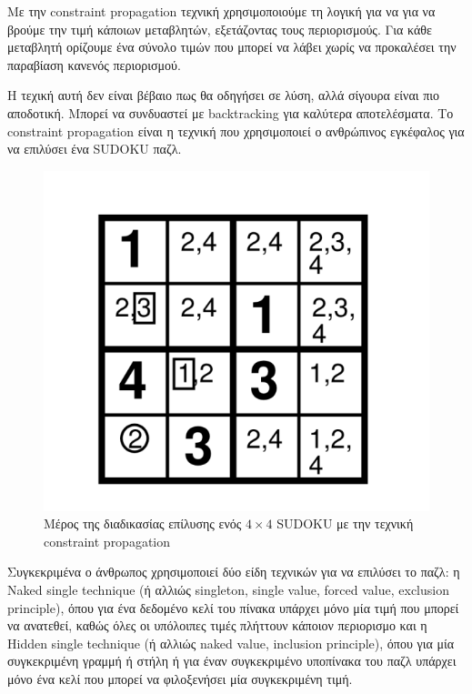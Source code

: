 \documentclass[12pt]{book}
\theoremstyle{definition}
\begin{document}
Με την constraint propagation τεχνική χρησιμοποιούμε τη λογική για να για να βρούμε την τιμή κάποιων μεταβλητών, εξετάζοντας τους περιορισμούς. Για κάθε μεταβλητή ορίζουμε ένα σύνολο τιμών που μπορεί να λάβει χωρίς να προκαλέσει την παραβίαση κανενός περιορισμού. \par

Η τεχική αυτή δεν είναι βέβαιο πως θα οδηγήσει σε λύση, αλλά σίγουρα είναι πιο αποδοτική. Μπορεί να συνδυαστεί με backtracking για καλύτερα αποτελέσματα. Το constraint propagation είναι η τεχνική που χρησιμοποιεί ο ανθρώπινος εγκέφαλος για να επιλύσει ένα SUDOKU παζλ. \par

\begin{figure}[h]
	\centering	
	\includegraphics[scale=0.45]{Figures/propagation.png}
	\caption{Μέρος της διαδικασίας επίλυσης ενός \(4 \times 4\) SUDOKU με την τεχνική constraint propagation}
\end{figure}

Συγκεκριμένα ο άνθρωπος χρησιμοποιεί δύο είδη τεχνικών για να επιλύσει το παζλ: η Naked single technique (ή αλλιώς singleton, single value, forced value, exclusion
principle), όπου για ένα δεδομένο κελί του πίνακα υπάρχει μόνο μία τιμή που μπορεί να ανατεθεί, καθώς όλες οι υπόλοιπες τιμές πλήττουν κάποιον περιορισμο και η Hidden single technique (ή αλλιώς naked value, inclusion principle), όπου για μία συγκεκριμένη γραμμή ή στήλη ή για έναν συγκεκριμένο υποπίνακα του παζλ υπάρχει μόνο ένα κελί που μπορεί να φιλοξενήσει μία συγκεκριμένη τιμή. \par
\end{document}
